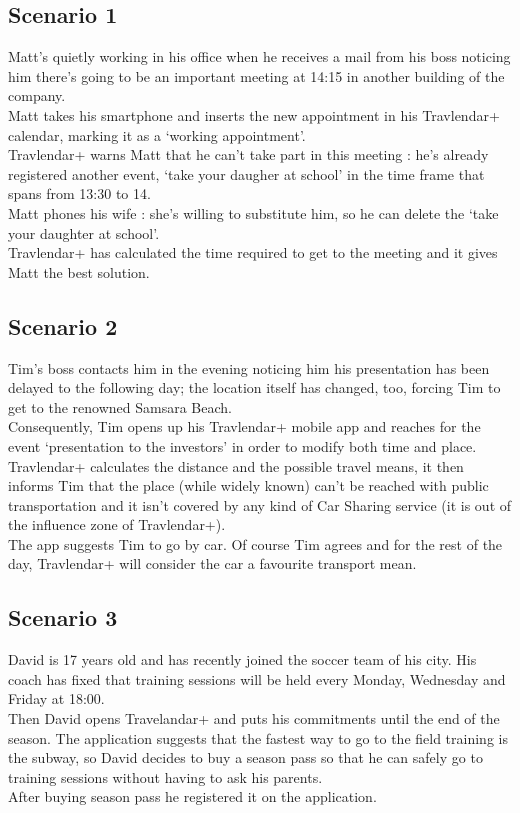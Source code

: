\subsection{Scenario 1}

Matt’s quietly working in his office when he receives a mail from his boss noticing him there’s going to be an important meeting at 14:15 in another building of the company. \\
Matt takes his smartphone and inserts the new appointment in his Travlendar+ calendar, marking it as a ‘working appointment’.\\
Travlendar+ warns Matt that he can’t take part in this meeting : he’s already registered another event, ‘take your daugher at school’ in the time frame that spans from 13:30 to 14.\\
Matt phones his wife : she’s willing to substitute him, so he can delete the ‘take your daughter at school’.\\
Travlendar+ has calculated the time required to get to the meeting and it gives Matt the best solution.

\subsection{Scenario 2}

Tim’s boss contacts him in the evening noticing him his presentation has been delayed to the following day; the location itself has changed, too, forcing Tim to get to the renowned Samsara Beach.\\
Consequently, Tim opens up his Travlendar+ mobile app and reaches for the event ‘presentation to the investors’ in order to modify both time and place.\\
Travlendar+ calculates the distance and the possible travel means, it then informs Tim that the place (while widely known) can’t be reached with public transportation and it isn’t covered by any kind of Car Sharing service (it is out of the influence zone of Travlendar+).\\
The app suggests Tim to go by car. Of course Tim agrees and for the rest of the day, Travlendar+ will consider the car a favourite transport mean.

\subsection{Scenario 3}

David is 17 years old and has recently joined the soccer team of his city. His coach has fixed that training sessions will be held every Monday, Wednesday and Friday at 18:00.\\
Then David opens Travelandar+ and puts his commitments until the end of the season. The application suggests that the fastest way to go to the field training is the subway, so David decides to buy a season pass so that he can safely go to training sessions without having to ask his parents.\\
After buying season pass he registered it on the application.

